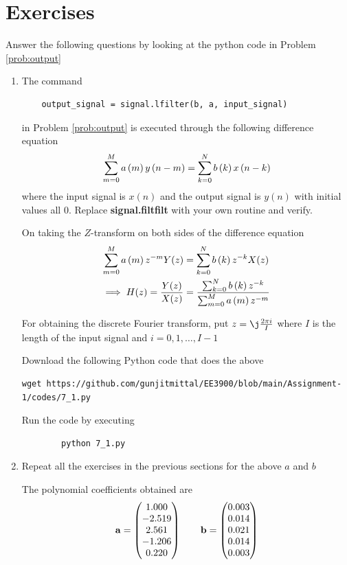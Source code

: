 \documentclass[journal,12pt,twocolumn]{IEEEtran}
\renewcommand\thesection{\arabic{section}}
\begin{document}
 \section{Exercises}
 Answer the following questions by looking at the python code in Problem \ref{prob:output}
	
	\begin{enumerate}[label=\thesection.\arabic*]
 \item The command
	\begin{lstlisting}
	output_signal = signal.lfilter(b, a, input_signal)
	\end{lstlisting}
	in Problem \ref{prob:output} is executed through the following difference equation
	\begin{equation}
		\label{eq:iir_filter_gen}
 		\sum _{m=0}^{M}a\left(m\right)y\left(n-m\right)=\sum _{k=0}^{N}b\left(k\right)x\left(n-k\right)
	\end{equation}
	where the input signal is $x(n)$ and the output signal is $y(n)$ with initial values all 0. Replace \textbf{signal.filtfilt} with your own routine and verify.
	
	\solution On taking the $Z$-transform on both sides of the difference equation
	\begin{align}
		\sum _{m=0}^{M}a\left(m\right) z^{-m} Y(z) &= \sum _{k=0}^{N}b\left(k\right) z^{-k} X(z) \\
		\implies H(z) = \frac{Y(z)}{X(z)} &= \frac{\sum _{k=0}^{N}b\left(k\right) z^{-k}}{\sum _{m=0}^{M}a\left(m\right) z^{-m}}
	\end{align}
	
	For obtaining the discrete Fourier transform, put $z = \j \frac{2\pi i}{I}$ where $I$ is the length of the input signal and $i = 0, 1, \ldots, I-1$
	
	Download the following Python code that does the above
	\begin{lstlisting}
wget https://github.com/gunjitmittal/EE3900/blob/main/Assignment-1/codes/7_1.py
	\end{lstlisting}
	
	Run the code by executing
	\begin{lstlisting}
		python 7_1.py
	\end{lstlisting}
	
	\item Repeat all the exercises in the previous sections for the above $a$ and $b$
	
	\solution The polynomial coefficients obtained are
	\begin{align}
		\mathbf{a} = \begin{pmatrix}1.000 \\ -2.519 \\ 2.561 \\ -1.206 \\ 0.220\end{pmatrix} \qquad
		\mathbf{b} = \begin{pmatrix}0.003 \\ 0.014 \\ 0.021 \\ 0.014 \\ 0.003\end{pmatrix}
	\end{align}
	

\end{enumerate}
\end{document}
